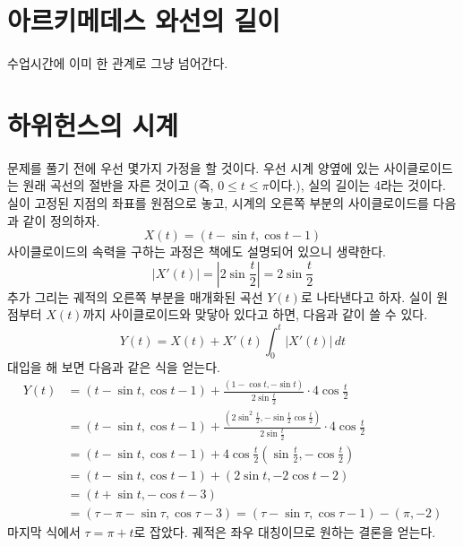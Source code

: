 \documentclass{scrartcl}
\begin{document}
\section{아르키메데스 와선의 길이}
수업시간에 이미 한 관계로 그냥 넘어간다.

\section{하위헌스의 시계}
문제를 풀기 전에 우선 몇가지 가정을 할 것이다. 우선 시계 양옆에 있는 사이클로이드는 원래 곡선의 절반을 자른 것이고 (즉, \(0\leq t\leq\pi\)이다.), 실의 길이는 4라는 것이다. 실이 고정된 지점의 좌표를 원점으로 놓고, 시계의 오른쪽 부분의 사이클로이드를 다음과 같이 정의하자.
\[X(t)=(t-\sin t, \cos t-1)\]
사이클로이드의 속력을 구하는 과정은 책에도 설명되어 있으니 생략한다.
\[|X'(t)|=\left|2\sin\frac{t}{2}\right|=2\sin\frac{t}{2}\]
추가 그리는 궤적의 오른쪽 부분을 매개화된 곡선 \(Y(t)\)로 나타낸다고 하자. 실이 원점부터 \(X(t)\)까지 사이클로이드와 맞닿아 있다고 하면, 다음과 같이 쓸 수 있다.
\[Y(t)=X(t)+X'(t)\int^t_0 |X'(t)|\,dt\]
대입을 해 보면 다음과 같은 식을 얻는다.
\begin{align*}
Y(t)&=(t-\sin t, \cos t-1)+\frac{(1-\cos t, -\sin t)}{2\sin\frac{t}{2}}\cdot4\cos\frac{t}{2} \\
&=(t-\sin t, \cos t-1)+\frac{(2\sin^2\frac{t}{2}, -\sin\frac{t}{2}\cos\frac{t}{2})}{2\sin\frac{t}{2}}\cdot4\cos\frac{t}{2} \\
&=(t-\sin t, \cos t-1)+4\cos\frac{t}{2}\left(\sin\frac{t}{2}, -\cos\frac{t}{2}\right) \\
&=(t-\sin t, \cos t-1)+(2\sin t, -2\cos t-2) \\
&=(t+\sin t, -\cos t-3) \\
&=(\tau-\pi-\sin\tau, \cos\tau-3)=(\tau-\sin\tau, \cos\tau-1)-(\pi,-2)
\end{align*}
마지막 식에서 \(\tau=\pi+t\)로 잡았다. 궤적은 좌우 대칭이므로 원하는 결론을 얻는다.
\end{document}
